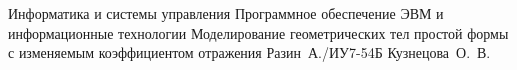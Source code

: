 \documentclass{bmstu}[a4paper]
\begin{document}
	\makecourseworktitle	
	{Информатика и системы управления} %
	{Программное обеспечение ЭВМ и информационные технологии} %
	{Моделирование геометрических тел простой формы с изменяемым коэффициентом отражения} %
	{Разин~А./ИУ7-54Б} %
	{Кузнецова~О.~В.} %
	{} %
	
	
	\maketableofcontents

	
	
	
	
	
	


	\makebibliography

	
\end{document}
